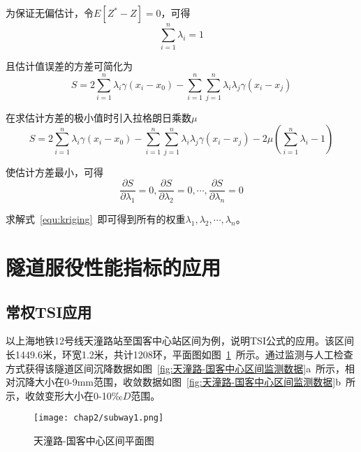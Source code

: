 为保证无偏估计，令$E\left[ {{Z}^{*}}-Z \right]=0$，可得
\begin{equation}
    \sum\limits_{i=1}^{n}{{{\lambda }_{i}}=1}
\end{equation}

且估计值误差的方差可简化为
\begin{equation}
    S=2\sum\limits_{i=1}^{n}{{{\lambda }_{i}}\gamma ({{x}_{i}}-{{x}_{0}})-\sum\limits_{i=1}^{n}{\sum\limits_{j=1}^{n}{{{\lambda }_{i}}{{\lambda }_{j}}\gamma ({{x}_{i}}-{{x}_{j}})}}}
\end{equation}

在求估计方差的极小值时引入拉格朗日乘数$\mu $
\begin{equation}
    S=2\sum\limits_{i=1}^{n}{{{\lambda }_{i}}\gamma ({{x}_{i}}-{{x}_{0}})-\sum\limits_{i=1}^{n}{\sum\limits_{j=1}^{n}{{{\lambda }_{i}}{{\lambda }_{j}}\gamma ({{x}_{i}}-{{x}_{j}})}}}-2\mu (\sum\limits_{i=1}^{n}{{{\lambda }_{i}}-1})
\end{equation}

使估计方差最小，可得
\begin{equation}
    \label{equ:kriging}
    \frac{\partial S}{\partial {{\lambda }_{1}}}=0,\frac{\partial S}{\partial {{\lambda }_{2}}}=0,\cdots ,\frac{\partial S}{\partial {{\lambda }_{n}}}=0
\end{equation}

求解式~\ref{equ:kriging}~即可得到所有的权重${{\lambda }_{1}},{{\lambda }_{2}},\cdots ,{{\lambda }_{n}}$。

\section{隧道服役性能指标的应用}

\subsection{常权TSI应用}

以上海地铁12号线天潼路站至国客中心站区间为例，说明TSI公式的应用。该区间长1449.6米，环宽1.2米，共计1208环，平面图如图~\ref{fig:天潼路-国客中心区间平面图}~所示。通过监测与人工检查方式获得该隧道区间沉降数据如图~\ref{fig:天潼路-国客中心区间监测数据}a~所示，相对沉降大小在0-9mm范围，收敛数据如图~\ref{fig:天潼路-国客中心区间监测数据}b~所示，收敛变形大小在0-10$‰D$范围。

\begin{figure}[htb!]
    \centering
    \texttt{[image: chap2/subway1.png]}
    \caption{天潼路-国客中心区间平面图}
    \label{fig:天潼路-国客中心区间平面图}
\end{figure}

